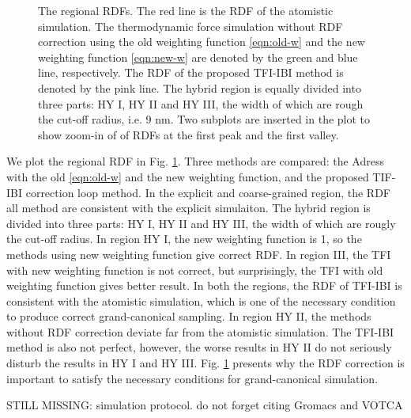 \documentclass[aps,pre,preprint,unsortedaddress]{revtex4}
\newcommand{\redc}[1]{{\color{red} #1}}
\begin{document}
\begin{figure}
  \caption{The regional RDFs. The red line is the RDF of the atomistic
    simulation. The thermodynamic force simulation without RDF
    correction using the old weighting function \eqref{eqn:old-w} and
    the new weighting function \eqref{eqn:new-w} are denoted by the
    green and blue line, respectively. The RDF of the proposed TFI-IBI
    method is denoted by the pink line. The hybrid region is equally
    divided into three parts: HY I, HY II and HY III, the width of
    which are rough the cut-off radius, i.e. 9 \textsf{nm}. Two
    subplots are inserted in the plot to show zoom-in of of RDFs at
    the first peak and the first valley.  }
  \label{fig:tmp7}
\end{figure}


We plot the regional RDF in Fig. \ref{fig:tmp7}. Three methods are
compared: the Adress with the old \eqref{eqn:old-w} and the new
weighting function, and the proposed TIF-IBI correction loop
method. In the explicit and coarse-grained region, the RDF all method
are consistent with the explicit simulaiton. The hybrid region is
divided into three parts: HY I, HY II and HY III, the width of which
are rougly the cut-off radius. In region HY I, the new weighting
function is 1, so the methods using new weighting function give
correct RDF. In region III, the TFI with new weighting function is not
correct, but surprisingly, the TFI with old weighting function gives
better result. In both the regions, the RDF of TFI-IBI is consistent
with the atomistic simulation, which is one of the necessary condition
to produce correct grand-canonical sampling.  In region HY II, the
methods without RDF correction deviate far from the atomistic
simulation. The TFI-IBI method is also not perfect, however, the worse
results in HY II do not seriously disturb the results in HY I and HY
III. Fig. \ref{fig:tmp7} presents why the RDF correction is important
to satisfy the necessary conditions for grand-canonical simulation.


\redc{STILL MISSING: simulation protocol. do not forget citing Gromacs and VOTCA}


{}

\end{document}
